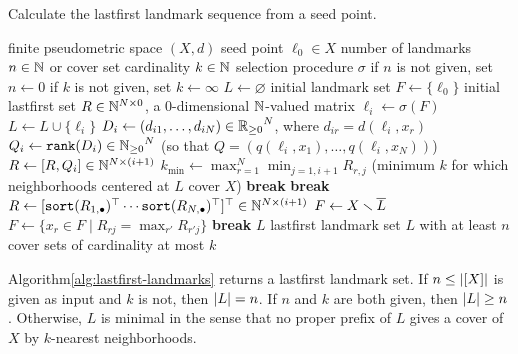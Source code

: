 \documentclass[
]{article}
\begin{document}
\begin{algorithm}
\caption{Calculate the lastfirst landmark sequence from a seed point.}
\label{alg:lastfirst-landmarks}
\begin{algorithmic}[1]
\REQUIRE finite pseudometric space $(X,d)$
\REQUIRE seed point $\ell_0 \in X$
\REQUIRE number of landmarks $n \in \mathbb{N}$ or cover set cardinality $k \in \mathbb{N}$
\REQUIRE selection procedure $\sigma$
\STATE if $n$ is not given, set $n \leftarrow 0$
\label{line:n}
\STATE if $k$ is not given, set $k \leftarrow \infty$
\label{line:k}
\STATE $L \leftarrow \varnothing$ initial landmark set
\STATE $F \leftarrow \{ \ell_0 \}$ initial lastfirst set
\STATE $R \in \mathbb{N}^{N \times 0}$, a $0$-dimensional $\mathbb{N}$-valued matrix
    \STATE $\ell_i \leftarrow \sigma(F)$
    \STATE $L \leftarrow L \cup \{\ell_i\}$
    \STATE $D_i \leftarrow (d_{i1},\ldots,d_{iN}) \in {\mathbb{R}_{\geq 0}}^N$, where $d_{ir} = d(\ell_i, x_r)$
    \STATE $Q_i \leftarrow \verb|rank|(D_i) \in {\N_{\geq 0}}^N$ (so that $Q = (q(\ell_i, x_1),\ldots,q(\ell_i, x_N))$)
    \label{line:rank}
    \STATE $R \leftarrow [R, Q_i] \in \mathbb{N}^{N \times (i+1)}$
    \STATE $k_{\min} \leftarrow \max_{r=1}^{N}{ \min_{j=1,i+1}{ R_{r,j} } }$ (minimum $k$ for which neighborhoods centered at $L$ cover $X$)
    \label{line:kmin}
        \STATE \textbf{break}
        \label{line:nonempty}
    \ENDIF
        \STATE \textbf{break}
        \label{line:check}
    \ENDIF
    \STATE $R \leftarrow [ \verb|sort|({R_{1,\bullet}})^\top \cdots \verb|sort|({R_{N,\bullet}})^\top ]^\top \in \N^{N \times (i+1)}$
    \label{line:sort}
    \STATE $F \leftarrow X \smallsetminus \overline{L}$
    \label{line:maximize}
        \STATE $F \leftarrow \{x_r \in F \mid R_{rj} = \max_{r'}{R_{r'j}}\}$
        \label{line:lastfirst}
            \STATE \textbf{break}
        \ENDIF
    \ENDFOR
\ENDFOR
\RETURN $L$
\RETURN lastfirst landmark set $L$ with at least $n$ cover sets of cardinality at most $k$
\end{algorithmic}
\end{algorithm}

\begin{proposition}
Algorithm\nbs\ref{alg:lastfirst-landmarks} returns a lastfirst landmark set.
If $n \leq \lvert [X]\rvert$ is given as input and $k$ is not, then $\lvert L\rvert = n$.
If $n$ and $k$ are both given, then $\lvert L\rvert \geq n$.
Otherwise, $L$ is minimal in the sense that no proper prefix of $L$ gives a cover of $X$ by $k$-nearest neighborhoods.
\end{proposition}
\end{document}
